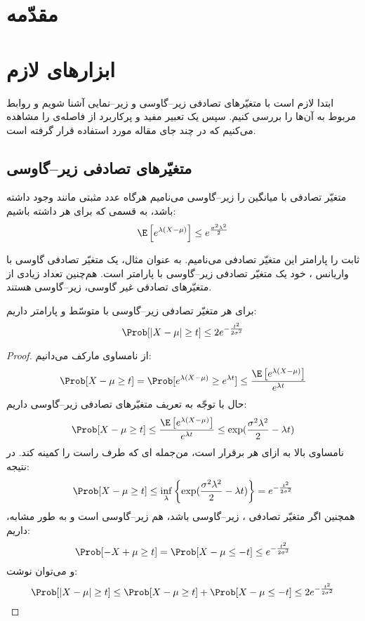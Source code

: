 
	
	\chapter{مقدّمه}
	
	\chapter{ابزارهای لازم}
	ابتدا لازم است با متغیّرهای تصادفی زیر--گاوسی و زیر--نمایی آشنا شویم و روابط مربوط به آن‌ها را بررسی کنیم. سپس یک تعبیر مفید و پرکاربرد از فاصله‌ی
	را مشاهده می‌کنیم که در چند جای مقاله مورد استفاده قرار گرفته است.
	\section{متغیّرهای تصادفی زیر--گاوسی}
	\begin{den}
		متغیّر تصادفی
		با میانگین
		را زیر--گاوسی می‌نامیم هرگاه عدد مثبتی مانند
		\lr{$\sigma$}
		وجود داشته باشد، به قسمی که برای هر
		داشته باشیم:
		\[\E\left[e^{\lambda(X-\mu)}\right]\leq e^{\frac{\sigma^2\lambda^2}{2}}\]
	\end{den}
	ثابت
	\lr{$\sigma$}
	را پارامتر این متغیّر تصادفی می‌نامیم. به عنوان مثال، یک متغیّر تصادفی گاوسی با واریانس
	،
	خود یک متغیّر تصادفی زیر--گاوسی با پارامتر
	\lr{$\sigma$}
	است. هم‌چنین تعداد زیادی از متغیّرهای تصادفی غیر گاوسی، زیر--گاوسی هستند.
	
	\begin{thm}	\label{thm1subgaussian}
		برای هر متغیّر تصادفی زیر--گاوسی 
		با متوسّط
		\lr{$\mu = \E[X]$}
		و پارامتر
		\lr{$\sigma$}
		داریم:
		\begin{equation}
		\Prob[|X-\mu|\geq t] \leq 2e^{-\frac{t^2}{2\sigma^2}}
		\end{equation}
	\end{thm}
	\begin{proof}
		از نامساوی مارکف می‌دانیم:
		\[\Prob[X-\mu\geq t] = \Prob[e^{\lambda (X-\mu)} \geq e^{\lambda t}] \leq \frac{\E\left[e^{\lambda (X-\mu)}\right]}{e^{\lambda t}} \]
		حال با توجّه به تعریف متغیّرهای تصادفی زیر--گاوسی داریم:
		\[\Prob[X-\mu\geq t] \leq \frac{\E\left[e^{\lambda (X-\mu)}\right]}{e^{\lambda t}} \leq \exp(\frac{\sigma^2\lambda^2}{2} - \lambda t)\]
		نامساوی بالا به ازای هر
		\lr{$\lambda\in\R$}
		برقرار است، من‌جمله
		\lr{$\lambda$}ای
		که طرف راست را کمینه کند. در نتیجه:
		\begin{equation}
		\Prob[X-\mu\geq t] \leq \inf_\lambda\left\{\exp(\frac{\sigma^2\lambda^2}{2} - \lambda t) \right\} = e^{-\frac{t^2}{2\sigma^2}}
		\end{equation}
		همچنین اگر متغیّر تصادفی
		،
		زیر--گاوسی باشد، 
		هم زیر--گاوسی است و به طور مشابه، داریم:
		\[\Prob[-X+\mu\geq t] = \Prob[X-\mu\leq -t]\leq  e^{-\frac{t^2}{2\sigma^2}}\]
		و می‌توان نوشت:
		\[\Prob[|X-\mu|\geq t] \leq \Prob[X-\mu\geq t] + \Prob[X-\mu\leq -t] \leq 2e^{-\frac{t^2}{2\sigma^2}}\]
	\end{proof}
	

